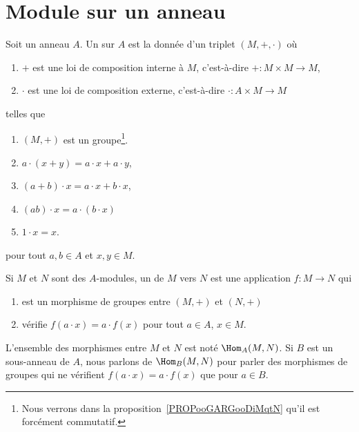 \section{Module sur un anneau}

\begin{definition}       \label{DEFooHXITooBFvzrR}
	Soit un anneau \( A\). Un  sur \( A\) est la donnée d'un triplet \( (M,+,\cdot)\) où
	\begin{enumerate}
		\item
		      \( +\) est une loi de composition interne à \( M\), c'est-à-dire \( +\colon M\times M\to M\),
		\item
		      \( \cdot\) est une loi de composition externe, c'est-à-dire \( \cdot\colon A\times M\to M\)
	\end{enumerate}
	telles que
	\begin{enumerate}
		\item
		      \( (M,+)\) est un groupe\footnote{Nous verrons dans la proposition~\ref{PROPooGARGooDiMqtN} qu'il est forcément commutatif.}.
		\item
		      \( a\cdot(x+y)=a\cdot x+a\cdot y\),
		\item
		      \( (a+b)\cdot x=a\cdot x+b\cdot x\),
		\item
		      \( (ab)\cdot x=a\cdot(b\cdot x)\)
		\item
		      \( 1\cdot x=x\).
	\end{enumerate}
	pour tout \( a,b\in A\) et \( x,y\in M\).

	Si \( M\) et \( N\) sont des \( A\)-modules, un  de \( M\) vers \( N\) est une application \( f\colon M\to N\) qui
	\begin{enumerate}
		\item
		      est un morphisme de groupes entre \( (M,+)\) et \( (N,+)\)
		\item
		      vérifie \( f(a\cdot x)=a\cdot f(x)\) pour tout \( a\in A\), \( x\in M\).
	\end{enumerate}
	L'ensemble des morphismes entre \( M\) et \( N\) est noté \( \Hom_A(M,N)\). Si \( B\) est un sous-anneau de \( A\),  nous parlons de \( \Hom_B(M,N)\) pour parler des morphismes de groupes qui ne vérifient \( f(a\cdot x)=a\cdot f(x)\) que pour \( a\in B\).
\end{definition}

